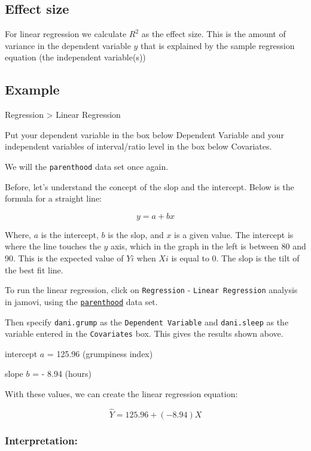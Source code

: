 \documentclass[
]{article}
\begin{document}
\hypertarget{effect-size}{%
\subsection{Effect size}\label{effect-size}}

For linear regression we calculate \(R^2\) as the effect size. This is the amount of variance in the dependent variable \(y\) that is explained by the sample regression equation (the independent variable(s))

\hypertarget{example}{%
\subsection{Example}\label{example}}

Regression \textgreater{} Linear Regression

Put your dependent variable in the box below Dependent Variable and your independent variables of interval/ratio level in the box below Covariates.

We will the \texttt{parenthood} data set once again.

Before, let's understand the concept of the slop and the intercept. Below is the formula for a straight line:

\[
y = a + bx
\]

Where, \(a\) is the intercept, \(b\) is the slop, and \(x\) is a given value. The intercept is where the line touches the \(y\) axis, which in the graph in the left is between 80 and 90. This is the expected value of \(Yi\) when \(Xi\) is equal to 0. The slop is the tilt of the best fit line.

To run the linear regression, click on \texttt{Regression} - \texttt{Linear\ Regression} analysis in jamovi, using the \href{https://lsj.readthedocs.io/en/latest/Ch12/_static/data/parenthood.omv}{\texttt{parenthood}} data set.

Then specify \texttt{dani.grump} as the \texttt{Dependent\ Variable} and \texttt{dani.sleep} as the variable entered in the \texttt{Covariates} box. This gives the results shown above.

intercept \(a\) = 125.96 (grumpiness index)

slope \(b\) = - 8.94 (hours)

With these values, we can create the linear regression equation:

\[
\hat{Y} = 125.96 + (-8.94)X
\]

\hypertarget{interpretation}{%
\subsubsection{Interpretation:}\label{interpretation}}
\end{document}
